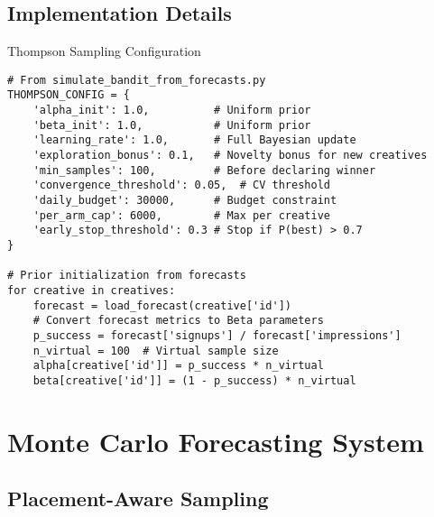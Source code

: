 \documentclass[11pt,a4paper]{report}
\begin{document}
\subsection{Implementation Details}

\begin{techbox}{Thompson Sampling Configuration}
\begin{verbatim}
# From simulate_bandit_from_forecasts.py
THOMPSON_CONFIG = {
    'alpha_init': 1.0,          # Uniform prior
    'beta_init': 1.0,           # Uniform prior
    'learning_rate': 1.0,       # Full Bayesian update
    'exploration_bonus': 0.1,   # Novelty bonus for new creatives
    'min_samples': 100,         # Before declaring winner
    'convergence_threshold': 0.05,  # CV threshold
    'daily_budget': 30000,      # Budget constraint
    'per_arm_cap': 6000,        # Max per creative
    'early_stop_threshold': 0.3 # Stop if P(best) > 0.7
}

# Prior initialization from forecasts
for creative in creatives:
    forecast = load_forecast(creative['id'])
    # Convert forecast metrics to Beta parameters
    p_success = forecast['signups'] / forecast['impressions']
    n_virtual = 100  # Virtual sample size
    alpha[creative['id']] = p_success * n_virtual
    beta[creative['id']] = (1 - p_success) * n_virtual
\end{verbatim}
\end{techbox}

\section{Monte Carlo Forecasting System}

\subsection{Placement-Aware Sampling}
\end{document}

